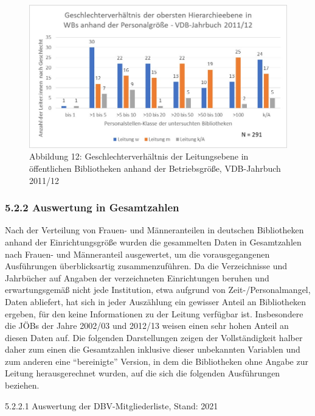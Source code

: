 \documentclass[a4paper,
fontsize=11pt,
oneside,
numbers=noperiodatend,
parskip=half-,
bibliography=totoc,
final
]{scrartcl}
\begin{document}
\begin{figure}
\centering
\includegraphics{img/Abb.12_VDB-2011.jpg}
\caption{Abbildung 12: Geschlechterverhältnis der Leitungsebene in
öffentlichen Bibliotheken anhand der Betriebsgröße, VDB-Jahrbuch
2011/12}
\end{figure}

\hypertarget{auswertung-in-gesamtzahlen}{%
\subsubsection{5.2.2 Auswertung in
Gesamtzahlen}\label{auswertung-in-gesamtzahlen}}

Nach der Verteilung von Frauen- und Männeranteilen in deutschen
Bibliotheken anhand der Einrichtungsgröße wurden die gesammelten Daten
in Gesamtzahlen nach Frauen- und Männeranteil ausgewertet, um die
vorausgegangenen Ausführungen überblicksartig zusammenzuführen. Da die
Verzeichnisse und Jahrbücher auf Angaben der verzeichneten Einrichtungen
beruhen und erwartungsgemäß nicht jede Institution, etwa aufgrund von
Zeit-/Personalmangel, Daten abliefert, hat sich in jeder Auszählung ein
gewisser Anteil an Bibliotheken ergeben, für den keine Informationen zu
der Leitung verfügbar ist. Insbesondere die JÖBs der Jahre 2002/03 und
2012/13 weisen einen sehr hohen Anteil an diesen Daten auf. Die
folgenden Darstellungen zeigen der Vollständigkeit halber daher zum
einen die Gesamtzahlen inklusive dieser unbekannten Variablen und zum
anderen eine \enquote{bereinigte} Version, in dem die Bibliotheken ohne
Angabe zur Leitung herausgerechnet wurden, auf die sich die folgenden
Ausführungen beziehen.

5.2.2.1 Auswertung der DBV-Mitgliederliste, Stand: 2021
\end{document}

